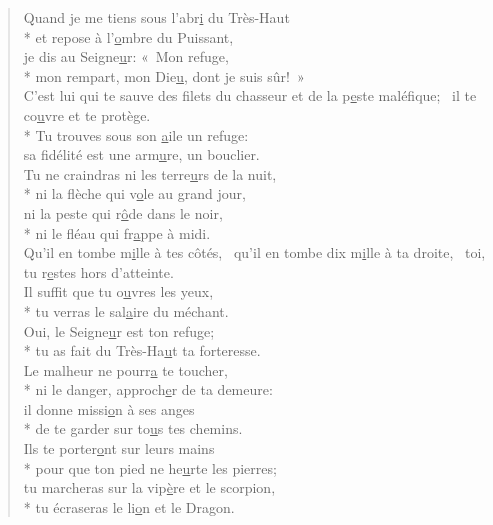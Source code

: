 \begin{verse}
Quand je me tiens sous l’abr\underline{i} du Très-Haut \\*
et repose à l’\underline{o}mbre du Puissant, \\
je dis au Seigne\underline{u}r: « Mon refuge, \\*
mon rempart, mon Die\underline{u}, dont je suis sûr! » \\

C’est lui qui te sauve des filets du chasseur
et de la p\underline{e}ste maléfique;~\psalmstar
{}il te co\underline{u}vre et te protège. \\*
Tu trouves sous son \underline{a}ile un refuge: \\
sa fidélité est une arm\underline{u}re, un bouclier. \\

Tu ne craindras ni les terre\underline{u}rs de la nuit, \\*
ni la flèche qui v\underline{o}le au grand jour, \\
ni la peste qui r\underline{ô}de dans le noir, \\*
ni le fléau qui fr\underline{a}ppe à midi. \\

Qu’il en tombe m\underline{i}lle à tes côtés,~\psalmdagger
qu’il en tombe dix m\underline{i}lle à ta droite,~\psalmstar
toi, tu r\underline{e}stes hors d’atteinte. \\

Il suffit que tu o\underline{u}vres les yeux, \\*
tu verras le sal\underline{a}ire du méchant. \\
Oui, le Seigne\underline{u}r est ton refuge; \\*
tu as fait du Très-Ha\underline{u}t ta forteresse. \\

Le malheur ne pourr\underline{a} te toucher, \\*
ni le danger, approch\underline{e}r de ta demeure: \\
il donne missi\underline{o}n à ses anges \\*
de te garder sur to\underline{u}s tes chemins. \\

Ils te porter\underline{o}nt sur leurs mains \\*
pour que ton pied ne he\underline{u}rte les pierres; \\
tu marcheras sur la vip\underline{è}re et le scorpion, \\*
tu écraseras le li\underline{o}n et le Dragon. \\


\end{verse}
